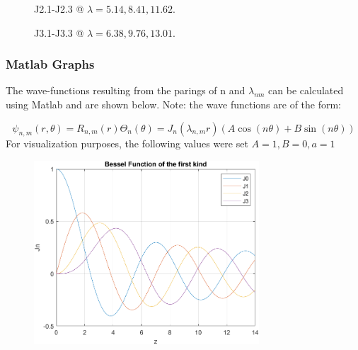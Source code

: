 \documentclass{article}
\begin{document}
\begin{figure}
    \caption{J2.1-J2.3 @ $\lambda= 5.14,8.41, 11.62$.}
    \label{fig:J2}
\end{figure}\begin{figure}
    \centering
    \caption{J3.1-J3.3 @ $\lambda= 6.38,9.76, 13.01$.}
    \label{fig:J3}
\end{figure}
\clearpage
\subsubsection{Matlab Graphs}
The wave-functions resulting from the parings of n and $\lambda_{nm}$ can be calculated using Matlab and are shown below. Note: the wave functions are of the form:

\begin{equation*}
    \psi_{n,m}(r,\theta)=R_{n,m}(r)\Theta_{n}(\theta)=J_{n}(\lambda_{n,m}r)(A\cos(n\theta)+B\sin(n\theta))
\end{equation*}
For visualization purposes, the following values were set $A=1, B=0, a=1$
\begin{figure}
\centering
\includegraphics[width=0.75\textwidth]{Besselfotfk.png}
\end{figure}
\clearpage
\end{document}
